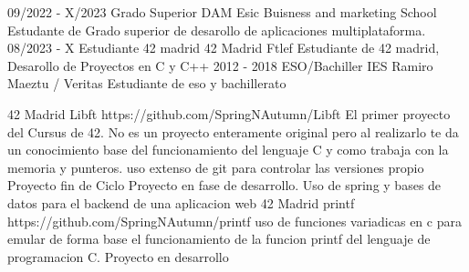 \documentclass[9pt]{developercv} %
\begin{document}

\vspace{-10 pt}
\begin{entrylist}
    \entry
		{09/2022 - X/2023}
		{Grado Superior DAM}
		{Esic Buisness and marketing School}
		{Estudante de Grado superior de desarollo de aplicaciones multiplataforma.  }
    \entry
		{08/2023 - X}
		{Estudiante 42 madrid}
		{42 Madrid Ftlef}
		{Estudiante de 42 madrid, Desarollo de Proyectos en C y C++ }
	\entry
		{2012 - 2018}
		{ESO/Bachiller}
		{IES Ramiro Maeztu / Veritas}
		{Estudiante de eso y bachillerato}
\end{entrylist}

\begin{entrylist}
    \entry
		{42 Madrid}
		{Libft}
		{https://github.com/SpringNAutumn/Libft}
		{El primer proyecto del Cursus de 42. No es un proyecto enteramente original pero al realizarlo te da un conocimiento base del funcionamiento del lenguaje C y como trabaja con la memoria y punteros. uso extenso de git para controlar las versiones }
    \entry
		{propio}
		{Proyecto fin de Ciclo}
		{}
		{Proyecto en fase de desarrollo. Uso de spring y bases de datos para el backend de una aplicacion web}
	\entry
		{42 Madrid}
		{printf}
		{https://github.com/SpringNAutumn/printf}
		{uso de funciones variadicas en c para emular de forma base el funcionamiento de la funcion printf del lenguaje de programacion C. Proyecto en desarrollo}
\end{entrylist}
\end{document}
